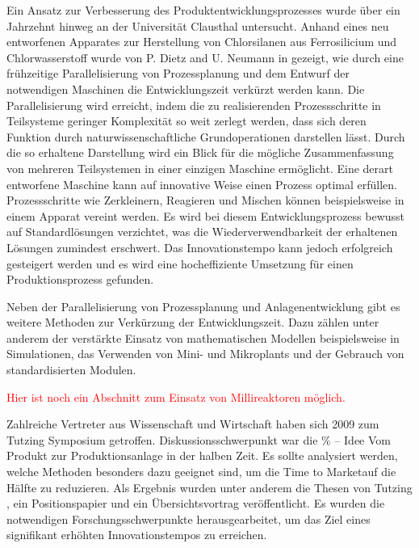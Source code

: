 Ein Ansatz zur Verbesserung des Produktentwicklungsprozesses wurde \"uber ein Jahrzehnt hinweg an der Universit\"at Clausthal untersucht. Anhand eines neu entworfenen Apparates zur Herstellung von Chlorsilanen aus Ferrosilicium und Chlorwasserstoff wurde von P. Dietz and U.  Neumann in \cite{Dietz_2000} gezeigt, wie durch eine fr\"uhzeitige Parallelisierung von Prozessplanung und dem Entwurf der notwendigen Maschinen die Entwicklungszeit verk\"urzt werden kann. Die Parallelisierung wird erreicht, indem die zu realisierenden Prozessschritte in Teilsysteme geringer Komplexit\"at so weit zerlegt werden, dass sich deren Funktion durch naturwissenschaftliche Grundoperationen darstellen l\"asst. Durch die so erhaltene Darstellung wird ein Blick f\"ur die m\"ogliche Zusammenfassung von mehreren Teilsystemen in einer einzigen Maschine erm\"oglicht. Eine derart entworfene Maschine kann auf innovative Weise einen Prozess optimal erf\"ullen. Prozessschritte wie Zerkleinern, Reagieren und Mischen k\"onnen beispielsweise in einem Apparat vereint werden. Es wird bei diesem Entwicklungsprozess bewusst auf Standardl\"osungen verzichtet, was die Wiederverwendbarkeit der erhaltenen L\"osungen zumindest erschwert. Das Innovationstempo kann jedoch erfolgreich gesteigert werden und es wird eine hocheffiziente Umsetzung f\"ur einen  Produktionsprozess gefunden. 

Neben der Parallelisierung von Prozessplanung und Anlagenentwicklung gibt es weitere Methoden zur Verk\"urzung der Entwicklungszeit. Dazu z\"ahlen unter anderem der verst\"arkte Einsatz von mathematischen Modellen beispielsweise in Simulationen, das Verwenden von Mini- und Mikroplants und der Gebrauch von standardisierten Modulen.

\textcolor{red}{Hier ist noch ein Abschnitt zum Einsatz von Millireaktoren m\"oglich.}

Zahlreiche Vertreter aus Wissenschaft und Wirtschaft haben sich 2009 zum Tutzing Symposium getroffen. Diskussionsschwerpunkt war die \% -- Idee Vom Produkt zur Produktionsanlage in der halben Zeit\grqq { }. Es sollte analysiert werden, welche Methoden besonders dazu geeignet sind, um die \glqq Time to Market\grqq { }auf die H\"alfte zu reduzieren. Als Ergebnis wurden unter anderem die Thesen von Tutzing \cite{Processnet_2009}, ein Positionspapier \cite{Processnet_2010} und ein \"Ubersichtsvortrag \cite{Schembecker_2009} ver\"offentlicht. Es wurden die notwendigen Forschungsschwerpunkte herausgearbeitet, um das Ziel eines signifikant erh\"ohten Innovationstempos zu erreichen.


